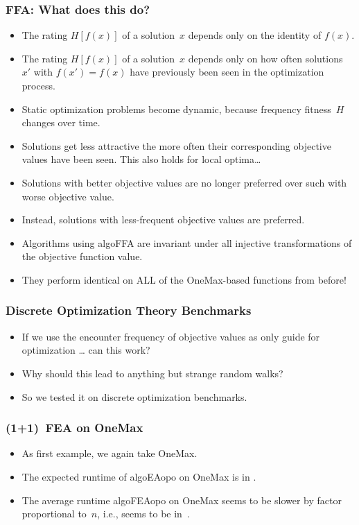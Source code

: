 \documentclass[aspectratio=169,mathserif,notheorems]{beamer}%
\begin{document}
\begin{frame}%
\frametitle{FFA: What does this do?}%
\begin{itemize}%
\item The rating $H[f(x)]$ of a solution~$x$ depends only on the identity of $f(x)$.
\item<2-> The rating $H[f(x)]$ of a solution~$x$ depends only on how often solutions~$x'$ with $f(x')=f(x)$ have previously been seen in the optimization process.%
\item<3-> Static optimization problems become dynamic, because frequency fitness~$H$ changes over time.%
\item<4-> Solutions get less attractive the more often their corresponding objective values have been seen. This also holds for local optima\dots%
\item<5-> Solutions with better objective values are no longer preferred over such with worse objective value.%
\item<6-> Instead, solutions with less-frequent objective values are preferred.%
\item<7-> \alert{Algorithms using \gls{algoFFA} are invariant under all injective transformations of the objective function value.}%
\item<8-> \alert{They perform identical on ALL of the OneMax-based functions from before!}%
\end{itemize}%
\end{frame}%
%
\begin{frame}[t]%
\frametitle{Discrete Optimization Theory Benchmarks}%
\begin{itemize}%
\item If we use the encounter frequency of objective values as \alert{only} guide for optimization {\dots} can this work?%
\item<2-> Why should this lead to anything but strange random walks?%
\item<3-> So we tested it on discrete optimization benchmarks.%
\end{itemize}%
%
%
\end{frame}%
%
\begin{frame}%
\frametitle{(1+1)~FEA on OneMax}%
\parbox{0.37\paperwidth}{%
\begin{itemize}%
\item As first example, we again take OneMax\cite{M1992HGARWMAH}.%
\item<2-> The expected runtime of \gls{algoEAopo} on OneMax is in .\cite{DDE2015FBBCTDNGA,M1992HGARWMAH}%
\item<3-> The average runtime \gls{algoFEAopo} on OneMax seems to be slower by factor proportional to~$n$, i.e., seems to be in~.%
\end{itemize}%
}%
%
%
%
\end{frame}%
\end{document}
